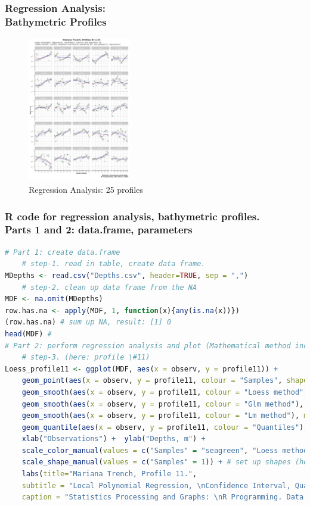 \documentclass[pdflatex,compress,10pt,
	xcolor={dvipsnames,dvipsnames,svgnames,x11names,table},
	hyperref={colorlinks = true,breaklinks = true, urlcolor = NavyBlue, breaklinks = true}]{beamer}
\begin{document}
\begin{frame}\frametitle{Regression Analysis:\\Bathymetric Profiles}
\begin{figure}[H]
	\centering
		\includegraphics[width=4.5cm]{Fig-2-8a.jpg}
	\caption{Regression Analysis: 25 profiles}
\end{figure}		
\end{frame}

\begin{frame}[fragile,shrink=10]\frametitle{R code for regression analysis, bathymetric profiles.\\ Parts 1 and 2: data.frame, parameters}
\begin{lstlisting}[language=R]
# Part 1: create data.frame
	# step-1. read in table, create data frame.
MDepths <- read.csv("Depths.csv", header=TRUE, sep = ",")
	# step-2. clean up data frame from the NA
MDF <- na.omit(MDepths) 
row.has.na <- apply(MDF, 1, function(x){any(is.na(x))}) 
(row.has.na) # sum up NA, result: [1] 0
head(MDF) #  
# Part 2: perform regression analysis and plot (Mathematical method includes 3 types of curves with confidence intervals and quantiles).
	# step-3. (here: profile \#11) 
Loess_profile11 <- ggplot(MDF, aes(x = observ, y = profile11)) +
	geom_point(aes(x = observ, y = profile11, colour = "Samples", shape = "Samples"), show.legend=TRUE) +
	geom_smooth(aes(x = observ, y = profile11, colour = "Loess method"), method = loess, se = TRUE, span = .4, size=.3, linetype = "solid", show.legend=TRUE) +
	geom_smooth(aes(x = observ, y = profile11, colour = "Glm method"), method = glm, se = FALSE, span = .4, size=.4, linetype = "dotted", show.legend=TRUE) +
	geom_smooth(aes(x = observ, y = profile11, colour = "Lm method"), method = lm, se = TRUE, size=.3, linetype = "solid", show.legend=TRUE) +
	geom_quantile(aes(x = observ, y = profile11, colour = "Quantiles"), linetype = "solid", show.legend=TRUE) +
	xlab("Observations") +  ylab("Depths, m") +
	scale_color_manual(values = c("Samples" = "seagreen", "Loess method" = "red", "Lm method" = "blue", "Glm method" = "orange", "Quantiles" = "purple")) + # set up colors
	scale_shape_manual(values = c("Samples" = 1)) + # set up shapes (here: \#1 - "transparent circle")
	labs(title="Mariana Trench, Profile 11.", 
	subtitle = "Local Polynomial Regression, \nConfidence Interval, Quantiles \n(LOESS method: locally weighted scatterplot \nsmoothing for non-parametric regression)",
	caption = "Statistics Processing and Graphs: \nR Programming. Data Source: QGIS") + theme(
	\end{lstlisting}
\end{frame}
\end{document}
